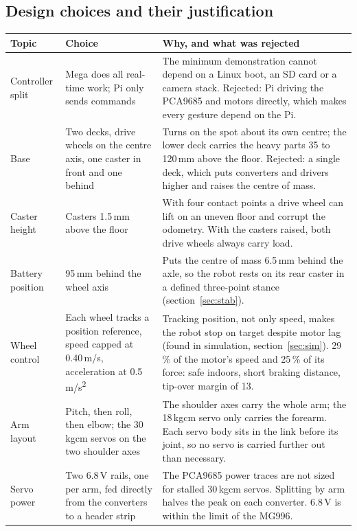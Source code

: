 \documentclass[11pt,a4paper]{article}
\newcommand{\kgcm}{kg\textperiodcentered cm}
\begin{document}
\subsection{Design choices and their justification}
\begin{table}[H]\small
\begin{tabularx}{\linewidth}{@{}P{33mm}P{45mm}L@{}}
\toprule
\textbf{Topic} & \textbf{Choice} & \textbf{Why, and what was rejected}\\
\midrule
Controller split & Mega does all real-time work; Pi only sends commands & The minimum demonstration cannot depend on a Linux boot, an SD card or a camera stack. Rejected: Pi driving the PCA9685 and motors directly, which makes every gesture depend on the Pi.\\
Base & Two decks, drive wheels on the centre axis, one caster in front and one behind & Turns on the spot about its own centre; the lower deck carries the heavy parts 35 to 120\,mm above the floor. Rejected: a single deck, which puts converters and drivers higher and raises the centre of mass.\\
Caster height & Casters 1.5\,mm above the floor & With four contact points a drive wheel can lift on an uneven floor and corrupt the odometry. With the casters raised, both drive wheels always carry load.\\
Battery position & 95\,mm behind the wheel axis & Puts the centre of mass 6.5\,mm behind the axle, so the robot rests on its rear caster in a defined three-point stance (section~\ref{sec:stab}).\\
Wheel control & Each wheel tracks a position reference, speed capped at 0.40\,m/s, acceleration at 0.5\,m/s\textsuperscript{2} & Tracking position, not only speed, makes the robot stop on target despite motor lag (found in simulation, section~\ref{sec:sim}). 29\,\% of the motor's speed and 25\,\% of its force: safe indoors, short braking distance, tip-over margin of 13.\\
Arm layout & Pitch, then roll, then elbow; the 30\,\kgcm{} servos on the two shoulder axes & The shoulder axes carry the whole arm; the 18\,\kgcm{} servo only carries the forearm. Each servo body sits in the link before its joint, so no servo is carried further out than necessary.\\
Servo power & Two 6.8\,V rails, one per arm, fed directly from the converters to a header strip & The PCA9685 power traces are not sized for stalled 30\,\kgcm{} servos. Splitting by arm halves the peak on each converter. 6.8\,V is within the limit of the MG996.\\

\end{tabularx}
\end{table}
\end{document}
